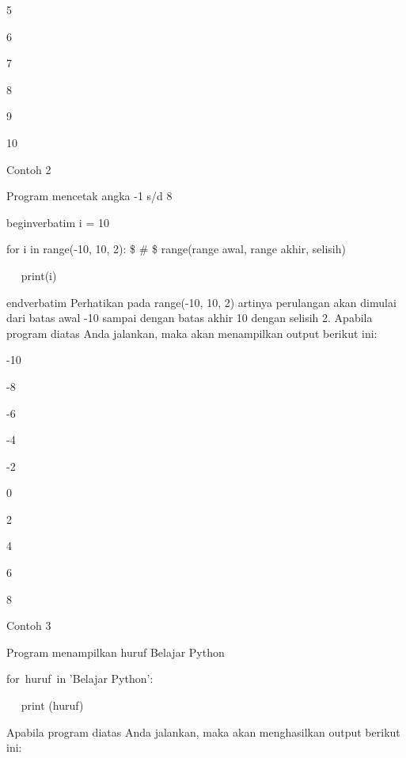 5 \par
6 \par
7 \par
8 \par
9 \par
10 \par
\vspace{\baselineskip}
Contoh 2\vspace{\baselineskip}
\vspace{\baselineskip}
 \par
 Program mencetak angka -1 s/d 8 \par
\vspace{12pt}
begin{verbatim}
i = 10 \par
for i in range(-10, 10, 2):  \$  \#  \$ range(range awal, range akhir, selisih) \par
~~ print(i) \par
end{verbatim}
\vspace{12pt}
\vspace{\baselineskip}
Perhatikan pada range(-10, 10, 2) artinya perulangan akan dimulai dari batas awal -10 sampai dengan batas akhir 10 dengan selisih 2.\vspace{\baselineskip}
\vspace{\baselineskip}
Apabila program diatas Anda jalankan, maka akan menampilkan output berikut ini:\vspace{\baselineskip}
\vspace{\baselineskip}
 \par
-10 \par
-8 \par
-6 \par
-4 \par
-2 \par
0 \par
2 \par
4 \par
6 \par
8 \par
\vspace{\baselineskip}
Contoh 3\vspace{\baselineskip}
\vspace{\baselineskip}
 \par
Program menampilkan huruf Belajar Python \par
for~huruf~in 'Belajar Python':    \par
~~ print (huruf) \par
\vspace{\baselineskip}
Apabila program diatas Anda jalankan, maka akan menghasilkan output berikut ini:\vspace{\baselineskip}
